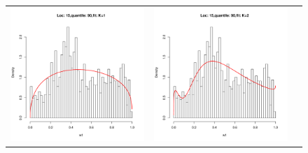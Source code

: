\begin{figure}[h]
\begin{tabular}{ccc}
\includegraphics[width=\textwidth/3]{../img/loc15/quantile90/fit_K1.pdf}
&
\includegraphics[width=\textwidth/3]{../img/loc15/quantile90/fit_K2.pdf}
&

\end{tabular}
\end{figure}
